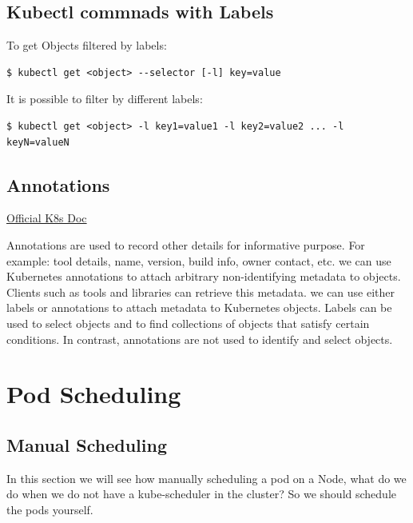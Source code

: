 \documentclass{article}
\newenvironment{codetemplate}[1][]{%
  \mybasecolorbox[#1]
  \itshape
}{%
  \endmybasecolorbox
}
\begin{document}
\subsection{Kubectl commnads with Labels}

To get Objects filtered by labels:
\begin{codetemplate}{}
\begin{verbatim}
$ kubectl get <object> --selector [-l] key=value
\end{verbatim}
\end{codetemplate}

It is possible to filter by different labels:
\begin{codetemplate}{}
\begin{verbatim}
$ kubectl get <object> -l key1=value1 -l key2=value2 ... -l keyN=valueN
\end{verbatim}
\end{codetemplate}

\subsection{Annotations}

\href{https://kubernetes.io/docs/concepts/overview/working-with-objects/annotations/}{Official K8s Doc}

Annotations are used to record other details for informative purpose. For example: tool details, name, version, build info, owner contact, etc. we can use Kubernetes annotations to attach arbitrary non-identifying metadata to objects. Clients such as tools and libraries can retrieve this metadata. we can use either labels or annotations to attach metadata to Kubernetes objects. Labels can be used to select objects and to find collections of objects that satisfy certain conditions. In contrast, annotations are not used to identify and select objects.

\newpage
\section{Pod Scheduling}

\subsection{Manual Scheduling}

In this section we will see how manually scheduling a pod on a Node, what do we do when we do not have a kube-scheduler in the cluster? So we should schedule the pods yourself.
\end{document}
